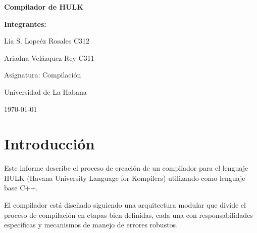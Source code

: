\documentclass[11pt, a4paper, twoside]{article} %
\begin{document}
\thispagestyle{empty} %

\begin{titlepage}
    \begin{center}

        {\color{green!80!black}\Huge\bfseries Compilador de HULK}\par
        \vspace{0.5cm}

        {\Large\bfseries Integrantes:}\par
        \vspace{0.3cm} %
        {\large  Lia S. Lope\'ez Rosales C312}\par
        {\large  Ariadna Vel\'azquez Rey C311}\par
        \vspace{1.5cm} %

        {\large Asignatura: Compilaci\'on}\par
        {\large Universidad de La Habana}\par
        \vspace{0.5cm}

        {\large \today}\par %
        \vfill %


    \end{center}
\end{titlepage}

\clearpage

\clearpage %

\section{Introducción}
Este informe describe el proceso de creación de un compilador para el lenguaje HULK (Havana University Language for Kompilers)
utilizando como lenguaje base C++.

El compilador está diseñado siguiendo una arquitectura modular que divide el proceso de compilación en etapas bien definidas, cada una con responsabilidades específicas y mecanismos de manejo de errores robustos.
\end{document}
